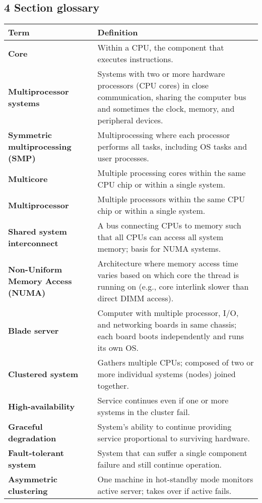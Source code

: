 \documentclass{article}
\begin{document}
\subsection*{4 Section glossary}
\centering
\begin{tabular}{>{\raggedright}p{} >{\raggedright\arraybackslash}p{}}
\toprule
\textbf{Term} & \textbf{Definition} \\
\midrule
\textbf{Core} & Within a CPU, the component that executes instructions. \\
\textbf{Multiprocessor systems} & Systems with two or more hardware processors (CPU cores) in close communication, sharing the computer bus and sometimes the clock, memory, and peripheral devices. \\
\textbf{Symmetric multiprocessing (SMP)} & Multiprocessing where each processor performs all tasks, including OS tasks and user processes. \\
\textbf{Multicore} & Multiple processing cores within the same CPU chip or within a single system. \\
\textbf{Multiprocessor} & Multiple processors within the same CPU chip or within a single system. \\
\textbf{Shared system interconnect} & A bus connecting CPUs to memory such that all CPUs can access all system memory; basis for NUMA systems. \\
\textbf{Non-Uniform Memory Access (NUMA)} & Architecture where memory access time varies based on which core the thread is running on (e.g., core interlink slower than direct DIMM access). \\
\textbf{Blade server} & Computer with multiple processor, I/O, and networking boards in same chassis; each board boots independently and runs its own OS. \\
\textbf{Clustered system} & Gathers multiple CPUs; composed of two or more individual systems (nodes) joined together. \\
\textbf{High-availability} & Service continues even if one or more systems in the cluster fail. \\
\textbf{Graceful degradation} & System's ability to continue providing service proportional to surviving hardware. \\
\textbf{Fault-tolerant system} & System that can suffer a single component failure and still continue operation. \\
\textbf{Asymmetric clustering} & One machine in hot-standby mode monitors active server; takes over if active fails. \\

\end{tabular}
\end{document}
